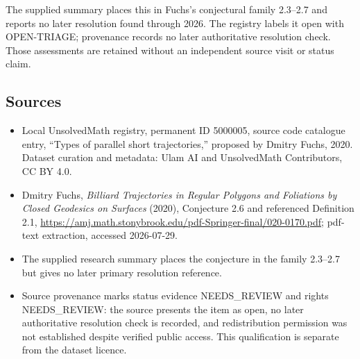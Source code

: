 \documentclass[11pt]{article}
\begin{document}
The supplied summary places this in Fuchs's conjectural family 2.3--2.7 and reports no later resolution found through 2026. The registry labels it open with OPEN-TRIAGE; provenance records no later authoritative resolution check. Those assessments are retained without an independent source visit or status claim.
\subsection{Sources}
\begin{itemize}
\item Local UnsolvedMath registry, permanent ID 5000005, source code catalogue entry, ``Types of parallel short trajectories,'' proposed by Dmitry Fuchs, 2020. Dataset curation and metadata: Ulam AI and UnsolvedMath Contributors, CC BY 4.0.
\item Dmitry Fuchs, \emph{Billiard Trajectories in Regular Polygons and Foliations by Closed Geodesics on Surfaces} (2020), Conjecture 2.6 and referenced Definition 2.1, \url{https://amj.math.stonybrook.edu/pdf-Springer-final/020-0170.pdf}; pdf-text extraction, accessed 2026-07-29.
\item The supplied research summary places the conjecture in the family 2.3--2.7 but gives no later primary resolution reference.
\item Source provenance marks status evidence NEEDS\_REVIEW and rights NEEDS\_REVIEW: the source presents the item as open, no later authoritative resolution check is recorded, and redistribution permission was not established despite verified public access. This qualification is separate from the dataset licence.
\end{itemize}
\end{document}
